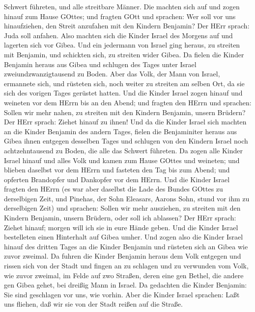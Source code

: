 Schwert führeten, und alle streitbare Männer.  Die machten
sich auf und zogen hinauf zum Hause GOttes; und fragten GOtt und
sprachen: Wer soll vor uns hinaufziehen, den Streit anzufahen mit den
Kindern Benjamin? Der HErr sprach: Juda soll anfahen.  Also
machten sich die Kinder Israel des Morgens auf und lagerten sich vor
Gibea.  Und ein jedermann von Israel ging heraus, zu
streiten mit Benjamin, und schickten sich, zu streiten wider Gibea.
 Da fielen die Kinder Benjamin heraus aus Gibea und
schlugen des Tages unter Israel zweiundzwanzigtausend zu Boden.
 Aber das Volk, der Mann von Israel, ermannete sich, und
rüsteten sich, noch weiter zu streiten am selben Ort, da sie sich des
vorigen Tages gerüstet hatten.  Und die Kinder Israel zogen
hinauf und weineten vor dem HErrn bis an den Abend; und fragten den
HErrn und sprachen: Sollen wir mehr nahen, zu streiten mit den Kindern
Benjamin, unsern Brüdern? Der HErr sprach: Ziehet hinauf zu ihnen!
 Und da die Kinder Israel sich machten an die Kinder
Benjamin des andern Tages,  fielen die Benjaminiter heraus
aus Gibea ihnen entgegen desselben Tages und schlugen von den Kindern
Israel noch achtzehntausend zu Boden, die alle das Schwert führeten.
 Da zogen alle Kinder Israel hinauf und alles Volk und
kamen zum Hause GOttes und weineten; und blieben daselbst vor dem HErrn
und fasteten den Tag bis zum Abend; und opferten Brandopfer und
Dankopfer vor dem HErrn.  Und die Kinder Israel fragten den
HErrn (es war aber daselbst die Lade des Bundes GOttes zu derselbigen
Zeit,  und Pinehas, der Sohn Eleasars, Aarons Sohn, stund
vor ihm zu derselbigen Zeit) und sprachen: Sollen wir mehr ausziehen, zu
streiten mit den Kindern Benjamin, unsern Brüdern, oder soll ich
ablassen? Der HErr sprach: Ziehet hinauf; morgen will ich sie in eure
Hände geben.  Und die Kinder Israel bestelleten einen
Hinterhalt auf Gibea umher.  Und zogen also die Kinder
Israel hinauf des dritten Tages an die Kinder Benjamin und rüsteten sich
an Gibea wie zuvor zweimal.  Da fuhren die Kinder Benjamin
heraus dem Volk entgegen und rissen sich von der Stadt und fingen an zu
schlagen und zu verwunden vom Volk, wie zuvor zweimal, im Felde auf zwo
Straßen, deren eine gen Bethel, die andere gen Gibea gehet, bei dreißig
Mann in Israel.  Da gedachten die Kinder Benjamin: Sie sind
geschlagen vor uns, wie vorhin. Aber die Kinder Israel sprachen: Laßt
uns fliehen, daß wir sie von der Stadt reißen auf die Straße.
